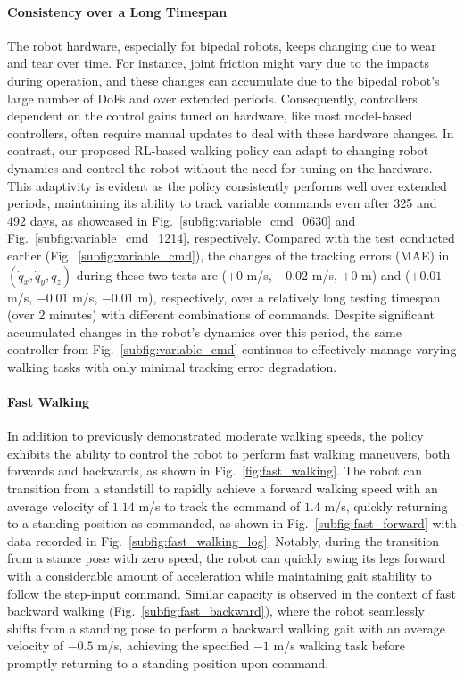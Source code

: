 \paragraph{Consistency over a Long Timespan}
The robot hardware, especially for bipedal robots, keeps changing due to wear and tear over time. 
For instance, joint friction might vary due to the impacts during operation, and these changes can accumulate due to the bipedal robot's large number of DoFs and over extended periods. 
Consequently, controllers dependent on the control gains tuned on hardware, like most model-based controllers, often require manual updates to deal with these hardware changes.
In contrast, our proposed RL-based walking policy can adapt to changing robot dynamics and control the robot without the need for tuning on the hardware. 
This adaptivity is evident as the policy consistently performs well over extended periods, maintaining its ability to track variable commands even after 325 and 492 days, as showcased in Fig.~\ref{subfig:variable_cmd_0630} and Fig.~\ref{subfig:variable_cmd_1214}, respectively. 
Compared with the test conducted earlier (Fig.~\ref{subfig:variable_cmd}), the changes of the tracking errors (MAE) in $(\dot{q}_x, \dot{q}_y, q_z)$ during these two tests are ($+0$ m/s, $-0.02$ m/s, $+0$ m) and ($+0.01$ m/s, $-0.01$ m/s, $-0.01$ m), respectively, over a relatively long testing timespan (over 2 minutes) with different combinations of commands.
Despite significant accumulated changes in the robot's dynamics over this period, the same controller from Fig.~\ref{subfig:variable_cmd} continues to effectively manage varying walking tasks with only minimal tracking error degradation.






\paragraph{Fast Walking}
In addition to previously demonstrated moderate walking speeds, the policy exhibits the ability to control the robot to perform fast walking maneuvers, both forwards and backwards, as shown in Fig.~\ref{fig:fast_walking}. 
The robot can transition from a standstill to rapidly achieve a forward walking speed with an average velocity of $1.14$ m/s to track the command of $1.4$ m/s, quickly returning to a standing position as commanded, as shown in Fig.~\ref{subfig:fast_forward} with data recorded in Fig.~\ref{subfig:fast_walking_log}.
Notably, during the transition from a stance pose with zero speed, the robot can quickly swing its legs forward with a considerable amount of acceleration while maintaining gait stability to follow the step-input command. 
Similar capacity is observed in the context of fast backward walking (Fig.~\ref{subfig:fast_backward}), where the robot seamlessly shifts from a standing pose to perform a backward walking gait with an average velocity of $-0.5$ m/s, achieving the specified $-1$ m/s walking task before promptly returning to a standing position upon command.



